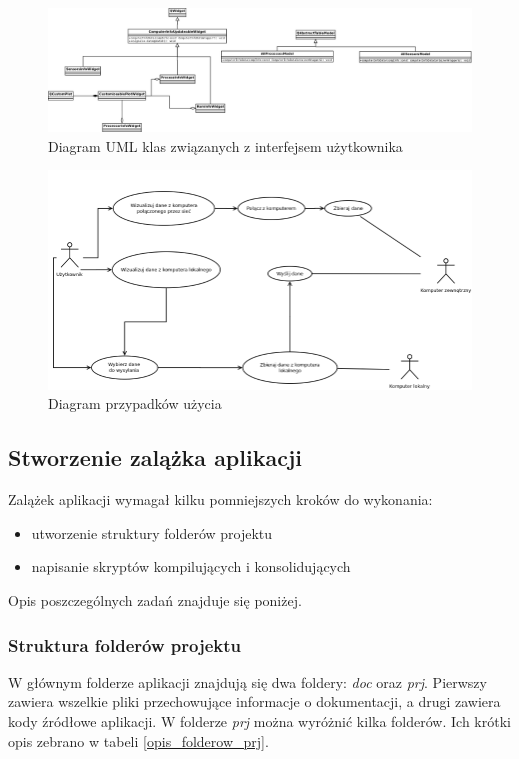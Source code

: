 \documentclass[a4paper]{article}
\begin{document}
\begin{figure}[h]
	\centering
	\includegraphics[width=0.75\paperheight, angle=90]{img/diagramKlasGui.png}
	\caption{Diagram UML klas związanych z interfejsem użytkownika}
	\label{diagram_klas_gui}
\end{figure}

\begin{figure}[h]
	\centering
	\includegraphics[width=0.75\paperheight, angle=90]{img/diagramPrzypadkowUzycia.png}
	\caption{Diagram przypadków użycia}
	\label{diagram_przypadkow_uzycia}
\end{figure}

\subsection{Stworzenie zalążka aplikacji}

Zalążek aplikacji wymagał kilku pomniejszych kroków do wykonania:
\begin{itemize}
	\item utworzenie struktury folderów projektu
	\item napisanie skryptów kompilujących i konsolidujących
\end{itemize}
Opis poszczególnych zadań znajduje się poniżej.

\subsubsection{Struktura folderów projektu}
W głównym folderze aplikacji znajdują się dwa foldery: \textit{doc} oraz \textit{prj}. Pierwszy zawiera wszelkie pliki przechowujące informacje o dokumentacji, a drugi zawiera kody źródłowe aplikacji. W folderze \textit{prj} można wyróżnić kilka folderów. Ich krótki opis zebrano w tabeli \ref{opis_folderow_prj}.
\end{document}
